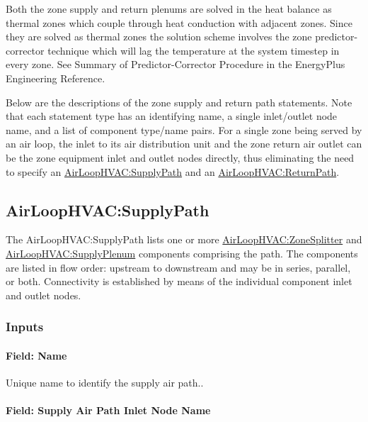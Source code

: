 Both the zone supply and return plenums are solved in the heat balance as thermal zones which couple through heat conduction with adjacent zones. Since they are solved as thermal zones the solution scheme involves the zone predictor-corrector technique which will lag the temperature at the system timestep in every zone. See Summary of Predictor-Corrector Procedure in the EnergyPlus Engineering Reference.

Below are the descriptions of the zone supply and return path statements. Note that each statement type has an identifying name, a single inlet/outlet node name, and a list of component type/name pairs. For a single zone being served by an air loop, the inlet to its air distribution unit and the zone return air outlet can be the zone equipment inlet and outlet nodes directly, thus eliminating the need to specify an \hyperref[airloophvacsupplypath]{AirLoopHVAC:SupplyPath} and an \hyperref[airloophvacreturnpath]{AirLoopHVAC:ReturnPath}.

\subsection{AirLoopHVAC:SupplyPath}\label{airloophvacsupplypath}

The AirLoopHVAC:SupplyPath lists one or more \hyperref[airloophvaczonesplitter]{AirLoopHVAC:ZoneSplitter} and \hyperref[airloophvacsupplyplenum]{AirLoopHVAC:SupplyPlenum} components comprising the path. The components are listed in flow order: upstream to downstream and may be in series, parallel, or both. Connectivity is established by means of the individual component inlet and outlet nodes.

\subsubsection{Inputs}\label{inputs-003}

\paragraph{Field: Name}\label{field-name-003}

Unique name to identify the supply air path..

\paragraph{Field: Supply Air Path Inlet Node Name}\label{field-supply-air-path-inlet-node-name}

